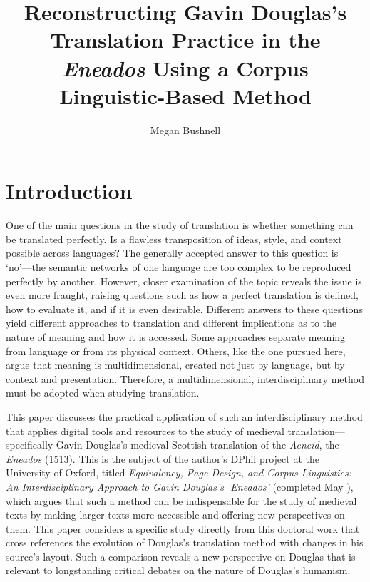 \documentclass{dhbenelux}
\author{Megan Bushnell}
\affil{University of Oxford}
\title{Reconstructing Gavin Douglas’s Translation Practice in the \emph{Eneados} Using a Corpus Linguistic-Based Method}
\begin{document}
\maketitle
\thispagestyle{papertitlepage} 

\section{Introduction}

One of the main questions in the study of translation is whether
something can be translated perfectly. Is a flawless transposition of
ideas, style, and context possible across languages? The generally
accepted answer to this question is `no'---the semantic networks of one
language are too complex to be reproduced perfectly by another. However,
closer examination of the topic reveals the issue is even more fraught,
raising questions such as how a perfect translation is defined, how to
evaluate it, and if it is even desirable. Different answers to these
questions yield different approaches to translation and different
implications as to the nature of meaning and how it is accessed. Some
approaches separate meaning from language or from its physical context.
Others, like the one pursued here, argue that meaning is
multidimensional, created not just by language, but by context and
presentation. Therefore, a multidimensional, interdisciplinary method
must be adopted when studying translation.

This paper discusses the practical application of such an
interdisciplinary method that applies digital tools and resources to the
study of medieval translation---specifically Gavin Douglas's medieval
Scottish translation of the \emph{Aeneid}, the \emph{Eneados} (1513).
This is the subject of the author's DPhil project at the University of
Oxford, titled \emph{Equivalency, Page Design, and Corpus Linguistics:
An Interdisciplinary Approach to Gavin Douglas's `Eneados'} (completed
May \citeyear{bushnell2021}), which argues that such a method can be indispensable for the
study of medieval texts by making larger texts more accessible and
offering new perspectives on them. This paper considers a specific study
directly from this doctoral work that cross references the evolution of
Douglas's translation method with changes in his source's layout. Such a
comparison reveals a new perspective on Douglas that is relevant to
longstanding critical debates on the nature of Douglas's humanism.
\end{document}
